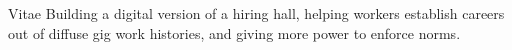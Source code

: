 \documentclass[../presentation]{subfiles}
\begin{document}
\begin{frame}[t]{Vitae}
  Building a digital version of a \alert{hiring hall}, helping workers establish \alert{careers} out of diffuse gig work histories, and giving more power to enforce norms.

\end{frame}
\end{document}
